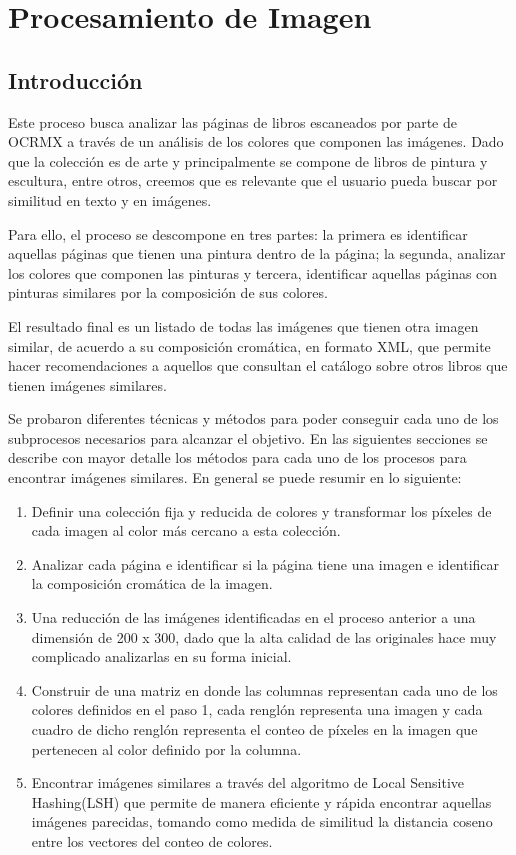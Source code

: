 \chapter{Procesamiento de Imagen}
\label{cap_im}
\section{Introducción}

Este proceso busca analizar las páginas de libros escaneados por parte de OCRMX  a través de un análisis de los colores que componen las imágenes. Dado que la colección es de arte y principalmente se compone de  libros de pintura y escultura, entre otros,  creemos que es relevante que el usuario  pueda buscar por similitud en texto y en imágenes. 


Para ello, el proceso se descompone en tres partes:  la primera es identificar aquellas páginas que tienen una pintura dentro de la página; la segunda, analizar los colores   que  componen las pinturas  y tercera, identificar aquellas páginas con pinturas similares por la composición de sus colores.

El resultado final es un listado de todas las imágenes que tienen otra imagen similar, de acuerdo a su composición cromática, en formato XML, que permite hacer recomendaciones a aquellos que consultan el catálogo sobre otros libros que tienen imágenes similares.

Se probaron diferentes técnicas y métodos para poder conseguir cada uno de los subprocesos necesarios para alcanzar el objetivo. En las siguientes secciones se describe con mayor detalle los métodos para cada uno de los procesos para encontrar  imágenes similares.  En general se puede resumir en lo siguiente:

\begin{enumerate}
\item Definir una colección fija y reducida de colores y transformar los píxeles de cada imagen al color más cercano a esta colección.
\item Analizar cada página e identificar si la página tiene una imagen e identificar la composición cromática de la imagen.
\item Una reducción de las imágenes identificadas en el proceso anterior a una dimensión de 200 x 300, dado que la alta calidad de las originales hace muy complicado analizarlas en su forma inicial.
\item Construir de una matriz en donde las columnas representan cada uno de los colores definidos en el paso 1, cada renglón representa una imagen y cada cuadro de dicho renglón representa el conteo de píxeles en la imagen que pertenecen al color definido por la columna.
\item Encontrar imágenes similares a través del algoritmo de Local Sensitive Hashing(LSH) que permite de manera eficiente y rápida encontrar aquellas imágenes parecidas, tomando como medida de similitud la distancia coseno entre los vectores del conteo de colores.
\end{enumerate}

